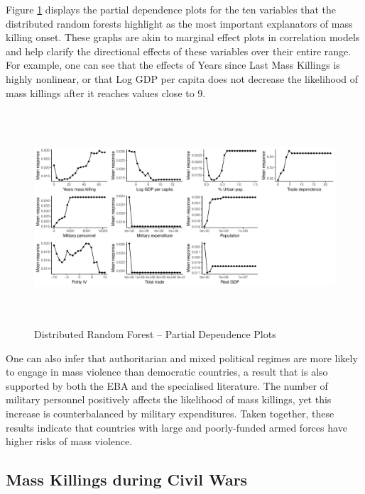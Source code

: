 \documentclass[a4paper,12pt]{article}
\begin{document}
Figure \ref{fig:drfdpp} displays the partial dependence plots for the ten variables that the distributed random forests highlight as the most important explanators of mass killing onset. These graphs are akin to marginal effect plots in correlation models and help clarify the directional effects of these variables over their entire range. For example, one can see that the effects of Years since Last Mass Killings is highly nonlinear, or that Log GDP per capita does not decrease the likelihood of mass killings after it reaches values close to 9.

\begin{figure}[H]
    \centering
    \includegraphics[width=\textwidth, height=8cm]{images/rf-mk-pd.pdf}
    \caption{Distributed Random Forest -- Partial Dependence Plots}
    \label{fig:drfdpp}
\end{figure}

One can also infer that authoritarian and mixed political regimes are more likely to engage in mass violence than democratic countries, a result that is also supported by both the EBA and the specialised literature. The number of military personnel positively affects the likelihood of mass killings, yet this increase is counterbalanced by military expenditures. Taken together, these results indicate that countries with large and poorly-funded armed forces have higher risks of mass violence. 

\subsection{Mass Killings during Civil Wars}%
\label{sub:mass_killings_during_civil_wars}
\end{document}
